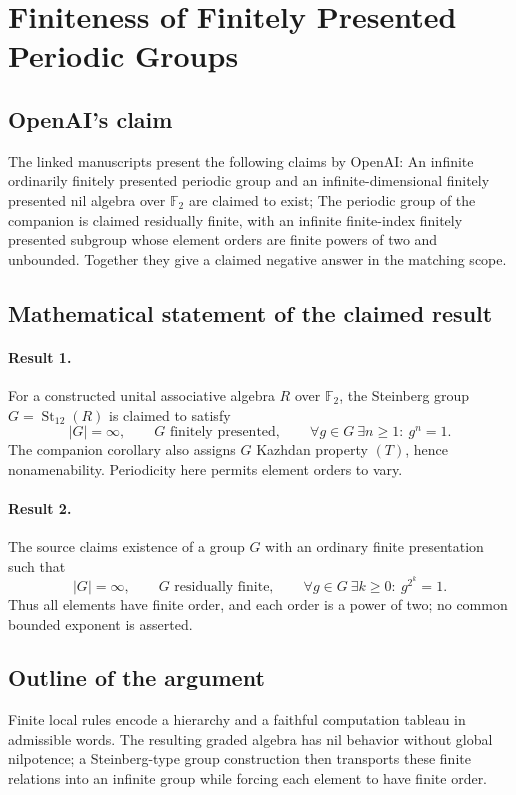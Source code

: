 \documentclass[11pt]{article}
\begin{document}
\section*{Finiteness of Finitely Presented Periodic Groups}

\subsection{OpenAI's claim}
The linked manuscripts present the following claims by OpenAI: An infinite ordinarily finitely presented periodic group and an infinite-dimensional finitely presented nil algebra over $\mathbb F_2$ are claimed to exist; The periodic group of the companion is claimed residually finite, with an infinite finite-index finitely presented subgroup whose element orders are finite powers of two and unbounded. Together they give a claimed negative answer in the matching scope.

\subsection{Mathematical statement of the claimed result}
\paragraph{Result 1.} For a constructed unital associative algebra \(R\) over \(\mathbb F_2\), the Steinberg group \(G=\operatorname{St}_{12}(R)\) is claimed to satisfy
\[
 |G|=\infty,\qquad G\text{ finitely presented},\qquad
 \forall g\in G\ \exists n\ge1:\ g^n=1.
\]
The companion corollary also assigns \(G\) Kazhdan property \((T)\), hence nonamenability. Periodicity here permits element orders to vary.

\paragraph{Result 2.} The source claims existence of a group \(G\) with an ordinary finite presentation such that
\[
 |G|=\infty,\qquad G\text{ residually finite},\qquad
 \forall g\in G\ \exists k\ge0:\ g^{2^k}=1.
\]
Thus all elements have finite order, and each order is a power of two; no common bounded exponent is asserted.

\subsection{Outline of the argument}
Finite local rules encode a hierarchy and a faithful computation tableau in admissible words. The resulting graded algebra has nil behavior without global nilpotence; a Steinberg-type group construction then transports these finite relations into an infinite group while forcing each element to have finite order.
\end{document}
